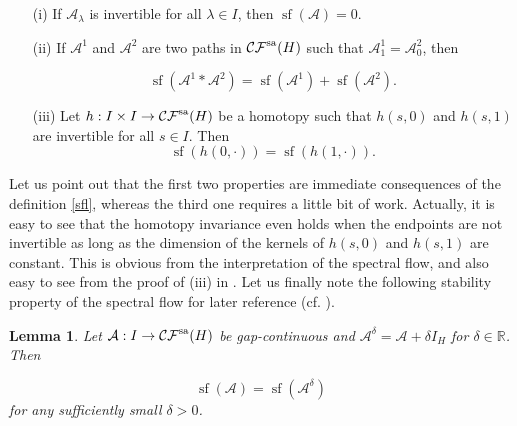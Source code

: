 \documentclass[a4paper,10pt]{article}
\newtheorem{lemma}[theorem]{Lemma}
\DeclareMathOperator{\sfl}{sf}
\begin{document}
\begin{enumerate}
\item[(i)] If $\mathcal{A}_\lambda$ is invertible for all $\lambda\in I$, then $\sfl(\mathcal{A})=0$.
\item[(ii)] If $\mathcal{A}^1$ and $\mathcal{A}^2$ are two paths in $\mathcal{CF}^\textup{sa}(H)$ such that $\mathcal{A}^1_1=\mathcal{A}^2_0$, then

\[\sfl(\mathcal{A}^1\ast\mathcal{A}^2)=\sfl(\mathcal{A}^1)+\sfl(\mathcal{A}^2).\]
\item[(iii)] Let $h:I\times I\rightarrow\mathcal{CF}^\textup{sa}(H)$ be a homotopy such that $h(s,0)$ and $h(s,1)$ are invertible for all $s\in I$. Then 
\[\sfl(h(0,\cdot))=\sfl(h(1,\cdot)).\]
\end{enumerate} 
Let us point out that the first two properties are immediate consequences of the definition \eqref{sfl}, whereas the third one requires a little bit of work. Actually, it is easy to see that the homotopy invariance even holds when the endpoints are not invertible as long as the dimension of the kernels of $h(s,0)$ and $h(s,1)$ are constant. This is obvious from the interpretation of the spectral flow, and also easy to see from the proof of (iii) in \cite{Philips}. Let us finally note the following stability property of the spectral flow for later reference (cf. \cite[\S 7]{Pejsachowicz}).

\begin{lemma}\label{sflperturbation}
Let $\mathcal{A}:I\rightarrow\mathcal{CF}^\textup{sa}(H)$ be gap-continuous and $\mathcal{A}^\delta=\mathcal{A}+\delta I_H$ for $\delta\in\mathbb{R}$. Then

\[\sfl(\mathcal{A})=\sfl(\mathcal{A}^\delta)\]  
for any sufficiently small $\delta>0$.
\end{lemma}
\end{document}

